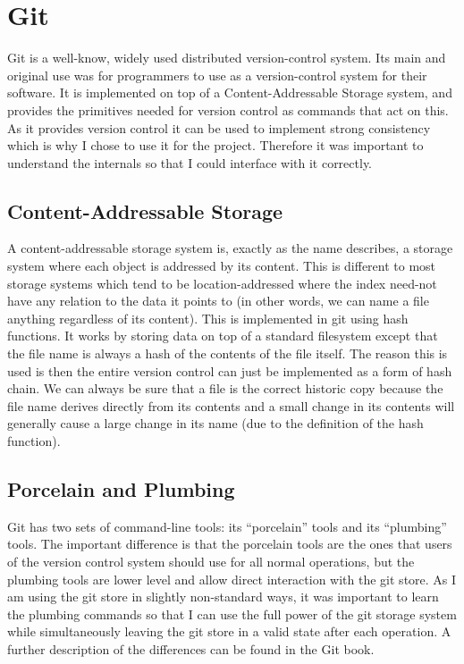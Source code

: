 \section{Git}

Git\cite{code_git} is a well-know, widely used distributed version-control system. Its main and original use was for programmers to use as a version-control system for their software\cite{chacon2014git}. It is implemented on top of a Content-Addressable Storage system, and provides the primitives needed for version control as commands that act on this. As it provides version control it can be used to implement strong consistency which is why I chose to use it for the project. Therefore it was important to understand the internals so that I could interface with it correctly.

\subsection{Content-Addressable Storage}

A content-addressable storage system is, exactly as the name describes, a storage system where each object is addressed by its content. This is different to most storage systems which tend to be location-addressed where the index need-not have any relation to the data it points to (in other words, we can name a file anything regardless of its content). This is implemented in git using hash functions. It works by storing data on top of a standard filesystem except that the file name is always a hash of the contents of the file itself. The reason this is used is then the entire version control can just be implemented as a form of hash chain. We can always be sure that a file is the correct historic copy because the file name derives directly from its contents and a small change in its contents will generally cause a large change in its name (due to the definition of the hash function). 

\subsection{Porcelain and Plumbing}

Git has two sets of command-line tools: its ``porcelain'' tools and its ``plumbing'' tools. The important difference is that the porcelain tools are the ones that users of the version control system should use for all normal operations, but the plumbing tools are lower level and allow direct interaction with the git store. As I am using the git store in slightly non-standard ways, it was important to learn the plumbing commands so that I can use the full power of the git storage system while simultaneously leaving the git store in a valid state after each operation. A further description of the differences can be found in the Git book\cite{chacon2014git}.

